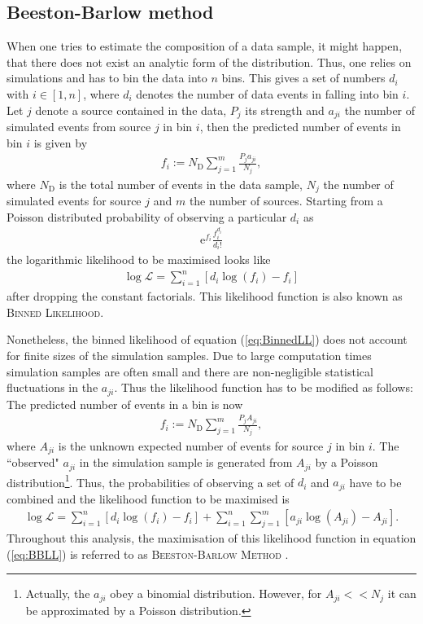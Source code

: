 \subsection{Beeston-Barlow method}
\label{sec:BeestonBarlow}
When one tries to estimate the composition of a data sample, it might happen, that there does not exist an analytic form of the distribution.
Thus, one relies on simulations and has to bin the data into $n$ bins.
This gives a set of numbers ${d_i}$ with $i \in [1,n]$, where $d_i$ denotes the number of data events in falling into bin $i$.
Let $j$ denote a source contained in the data, $P_j$ its strength and $a_{ji}$ the number of simulated events from source $j$ in bin $i$, then the predicted number of events in bin $i$ is given by
\begin{align}
    f_i := N_\text{D} \sum_{j=1}^{m} \frac{P_j a_{ji}}{N_j},
\end{align}
where $N_\text{D}$ is the total number of events in the data sample, $N_j$ the number of simulated events for source $j$ and $m$ the number of sources.
Starting from a Poisson distributed probability of observing a particular $d_i$ as
\begin{align}
    \mathrm{e}^{f_i} \frac{f_i^{d_i}}{d_i!}
\end{align}
the logarithmic likelihood to be maximised looks like
\begin{align}
    \log \mathcal{L} = \sum_{i=1}^{n} \left[d_i \log(f_i) - f_i\right] \label{eq:BinnedLL}
\end{align}
after dropping the constant factorials.
This likelihood function is also known as \textsc{Binned Likelihood}.

Nonetheless, the binned likelihood of equation (\ref{eq:BinnedLL}) does not account for finite sizes of the simulation samples.
Due to large computation times simulation samples are often small and there are non-negligible statistical fluctuations in the $a_{ji}$.
Thus the likelihood function has to be modified as follows:
The predicted number of events in a bin is now
\begin{align}
    f_i := N_\text{D} \sum_{j=1}^{m} \frac{P_j A_{ji}}{N_j},
\end{align}
where $A_{ji}$ is the unknown expected number of events for source $j$ in bin $i$.
The ``observed" $a_{ji}$ in the simulation sample is generated from $A_{ji}$ by a Poisson distribution\footnote{Actually, the $a_{ji}$ obey a binomial distribution. However, for $A_{ji} << N_j$ it can be approximated by a Poisson distribution.}.
Thus, the probabilities of observing a set of ${d_i}$ and $a_{ji}$ have to be combined and the likelihood function to be maximised is
\begin{align}
    \log \mathcal{L} = \sum_{i=1}^{n} \left[d_i \log(f_i) - f_i\right] + \sum_{i=1}^{n} \sum_{j=1}^{m} \left[a_{ji} \log(A_{ji}) - A_{ji}\right]. \label{eq:BBLL}
\end{align}
Throughout this analysis, the maximisation of this likelihood function in equation (\ref{eq:BBLL}) is referred to as \textsc{Beeston-Barlow Method} \cite{BeestonBarlow}.
